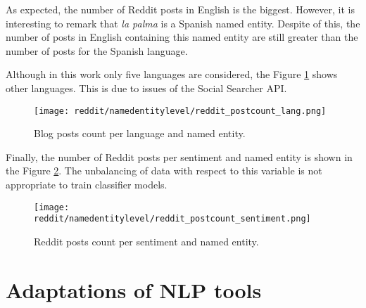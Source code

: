 \par As expected, the number of Reddit posts in English is the biggest. However, it is interesting to remark that \textit{la palma} is a Spanish named entity. Despite of this, the number of posts in English containing this named entity are still greater than the number of posts for the Spanish language. 
\par Although in this work only five languages are considered, the Figure \ref{fig:reddit_postcount_lang_entity} shows other languages. This is due to issues of the Social Searcher API.
\begin{figure}[H]
	\begin{center}
		\texttt{[image: reddit/namedentitylevel/reddit\_postcount\_lang.png]}
		\caption{Blog posts count per language and named entity.}
		\label{fig:reddit_postcount_lang_entity}
	\end{center}
\end{figure}


\par Finally, the number of Reddit posts per sentiment and named entity is shown in the Figure \ref{fig:reddit_postcount_sentiment_entity}. The unbalancing of data with respect to this variable is not appropriate to train classifier models.
\begin{figure}[H]
	\begin{center}
		\texttt{[image: reddit/namedentitylevel/reddit\_postcount\_sentiment.png]}
		\caption{Reddit posts count per sentiment and named entity.}
		\label{fig:reddit_postcount_sentiment_entity}
	\end{center}
\end{figure}


\section{Adaptations of NLP tools}

